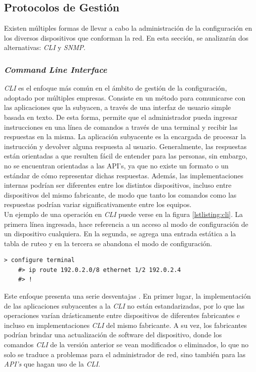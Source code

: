 \subsection{Protocolos de Gestión}
Existen múltiples formas de llevar a cabo la administración de la configuración en los diversos dispositivos que conforman la red. En esta sección, se analizarán dos alternativas: \textit{CLI} y \textit{SNMP}.

\subsubsection{\textit{Command Line Interface}}

\textit{CLI} es el enfoque más común en el ámbito de gestión de la configuración, adoptado por múltiples empresas. Consiste en un método para comunicarse con las aplicaciones que la subyacen, a través de una interfaz de usuario simple basada en texto. De esta forma, permite que el administrador pueda ingresar instrucciones en una línea de comandos a través de una terminal y recibir las respuestas en la misma. La aplicación subyacente es la encargada de procesar la instrucción y devolver alguna respuesta al usuario. Generalmente, las respuestas están orientadas a que resulten fácil de entender para las personas, sin embargo, no se encuentran orientadas a las API’s, ya que no existe un formato o un estándar de cómo representar dichas respuestas. Además, las implementaciones internas podrían ser diferentes entre los distintos dispositivos, incluso entre dispositivos del mismo fabricante, de modo que tanto los comandos como las respuestas podrían variar significativamente entre los equipos.
\\

Un ejemplo de una operación en \textit{CLI} puede verse en la figura \ref{lstlisting:cli}. La primera línea ingresada, hace referencia a un acceso al modo de configuración de un dispositivo cualquiera. En la segunda, se agrega una entrada estática a la tabla de ruteo y en la tercera se abandona el modo de configuración.

\begin{lstlisting}[language=SHELXL, caption=Interacción típica con un dispositivo mediante \textit{CLI}., label=lstlisting:cli]
	> configure terminal
	#> ip route 192.0.2.0/8 ethernet 1/2 192.0.2.4
	#> !
\end{lstlisting}


  Este enfoque presenta una serie desventajas \parencite{clilimitacion}. En primer lugar, la implementación de las aplicaciones subyacentes a la \textit{CLI} no están estandarizadas, por lo que las operaciones varían drásticamente entre dispositivos de diferentes fabricantes e incluso en implementaciones \textit{CLI} del mismo fabricante. A su vez, los fabricantes podrían brindar una actualización de software del dispositivo, donde los comandos \textit{CLI} de la versión anterior se vean modificados o eliminados, lo que no solo se traduce a problemas para el administrador de red, sino también para las \textit{API’s} que hagan uso de la \textit{CLI}. 
  \\

